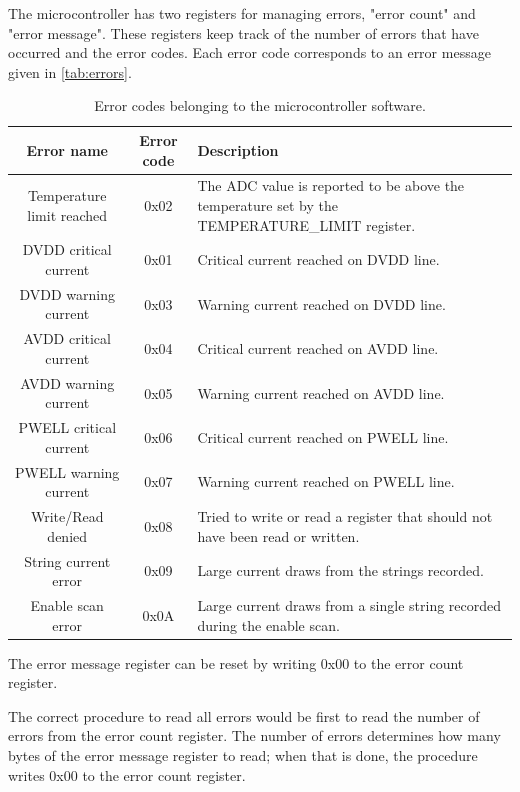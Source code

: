 \documentclass[main.tex]{subfiles}
\begin{document}
The microcontroller has two registers for managing errors, "error count" and "error message". These registers keep track of the number of errors that have occurred and the error codes. Each error code corresponds to an error message given in \autoref{tab:errors}.
\begin{table}[h]

\centering

\begin{tabular}{||c c p{7.5cm} ||}
 \hline
 Error name & Error code & Description \\ [0.5ex] 
 \hline\hline
 Temperature limit reached & 0x02 & The ADC value is reported to be above
the temperature set by the TEMPERATURE\_LIMIT register. \\ 
 \hline
 DVDD critical current & 0x01 & Critical current reached on DVDD line. \\ 
 \hline
 DVDD warning current & 0x03 & Warning current reached on DVDD line. \\
 \hline
 AVDD critical current & 0x04 & Critical current reached on AVDD line. \\ 
 \hline
 AVDD warning current & 0x05 & Warning current reached on AVDD line. \\ 
 \hline
 PWELL critical current & 0x06 & Critical current reached on PWELL line. \\ 
 \hline
 PWELL warning current & 0x07 & Warning current reached on PWELL line. \\ 
 \hline
 Write/Read denied & 0x08 & Tried to write or read a register that should not have been read or written. \\ 
 \hline
String current error & 0x09 & Large current draws from the strings recorded.\\
 \hline
Enable scan error & 0x0A & Large current draws from a single string recorded during the enable scan.\\ [1ex] 
 \hline

\end{tabular}
\caption{Error codes belonging to the microcontroller software.}
\label{tab:errors}
\end{table}
\FloatBarrier

The error message register can be reset by writing 0x00 to the error count register.

The correct procedure to read all errors would be first to read the number of errors from the error count register. The number of errors determines how many bytes of the error message register to read; when that is done, the procedure writes 0x00 to the error count register.

\end{document}
